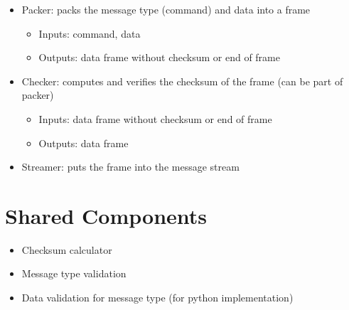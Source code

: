 \documentclass{customdocclass}
\begin{document}
\begin{itemize}
  \item Packer: packs the message type (command) and data into a frame
  \begin{itemize}
    \item Inputs: command, data
    \item Outputs: data frame without checksum or end of frame
  \end{itemize}
  \item Checker: computes and verifies the checksum of the frame (can be part of packer)
  \begin{itemize}
    \item Inputs: data frame without checksum or end of frame
    \item Outputs: data frame
  \end{itemize}
  \item Streamer: puts the frame into the message stream
\end{itemize}

\section{Shared Components}

\begin{itemize}
  \item Checksum calculator
  \item Message type validation
  \item Data validation for message type (for python implementation)
\end{itemize}
\end{document}
